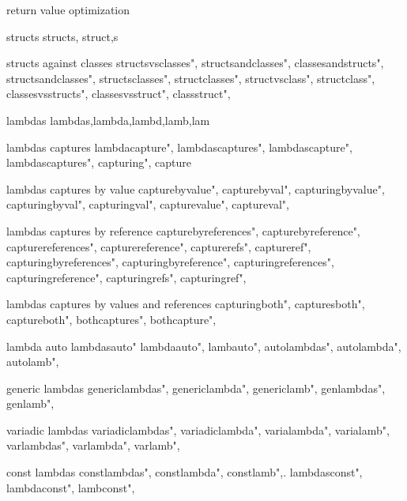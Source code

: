          return value optimization 
        
         structs 
        structs,
        struct,s
        
         structs against classes 
        structsvsclasses",  
        structsandclasses",  
        classesandstructs",  
        structsandclasses",  
        structsclasses",  
        structclasses",  
        structvsclass",  
        structclass",  
        classesvsstructs",  
        classesvsstruct",  
        classstruct",  
        
         lambdas
        lambdas,lambda,lambd,lamb,lam
        
         lambdas captures
        lambdacapture",  
        lambdascaptures",  
        lambdascapture",  
        lambdascaptures",  
        capturing",  
        capture
        
         lambdas captures by value
        capturebyvalue",  
        capturebyval",  
        capturingbyvalue",  
        capturingbyval",  
        capturingval",  
        capturevalue",  
        captureval",  
        
         lambdas captures by reference 
        capturebyreferences",  
        capturebyreference",  
        capturereferences",  
        capturereference",  
        capturerefs",  
        captureref",  
        capturingbyreferences",  
        capturingbyreference",  
        capturingreferences",  
        capturingreference",  
        capturingrefs",  
        capturingref",  
        
         lambdas captures by values and references 
        capturingboth",  
        capturesboth",  
        captureboth",  
        bothcaptures",  
        bothcapture",  
        
         lambda auto
        lambdasauto"
        lambdaauto",
        lambauto",
        autolambdas",
        autolambda",
        autolamb",
        
         generic lambdas
        genericlambdas",  
        genericlambda",  
        genericlamb",  
        genlambdas",  
        genlamb",  
        
         variadic lambdas 
        variadiclambdas",  
        variadiclambda",  
        varialambda",  
        varialamb",  
        varlambdas",  
        varlambda",  
        varlamb",  
        
         const lambdas 
        constlambdas",
        constlambda",
        constlamb",.
        lambdasconst",
        lambdaconst",
        lambconst",
        
